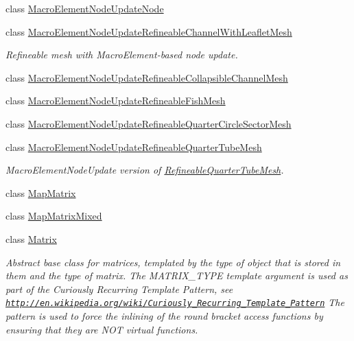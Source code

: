 \begin{DoxyCompactItemize}
class \hyperlink{classoomph_1_1MacroElementNodeUpdateNode}{Macro\+Element\+Node\+Update\+Node}
\item 
class \hyperlink{classoomph_1_1MacroElementNodeUpdateRefineableChannelWithLeafletMesh}{Macro\+Element\+Node\+Update\+Refineable\+Channel\+With\+Leaflet\+Mesh}
\begin{DoxyCompactList}\small\item\em Refineable mesh with Macro\+Element-\/based node update. \end{DoxyCompactList}\item 
class \hyperlink{classoomph_1_1MacroElementNodeUpdateRefineableCollapsibleChannelMesh}{Macro\+Element\+Node\+Update\+Refineable\+Collapsible\+Channel\+Mesh}
\item 
class \hyperlink{classoomph_1_1MacroElementNodeUpdateRefineableFishMesh}{Macro\+Element\+Node\+Update\+Refineable\+Fish\+Mesh}
\item 
class \hyperlink{classoomph_1_1MacroElementNodeUpdateRefineableQuarterCircleSectorMesh}{Macro\+Element\+Node\+Update\+Refineable\+Quarter\+Circle\+Sector\+Mesh}
\item 
class \hyperlink{classoomph_1_1MacroElementNodeUpdateRefineableQuarterTubeMesh}{Macro\+Element\+Node\+Update\+Refineable\+Quarter\+Tube\+Mesh}
\begin{DoxyCompactList}\small\item\em Macro\+Element\+Node\+Update version of \hyperlink{classoomph_1_1RefineableQuarterTubeMesh}{Refineable\+Quarter\+Tube\+Mesh}. \end{DoxyCompactList}\item 
class \hyperlink{classoomph_1_1MapMatrix}{Map\+Matrix}
\item 
class \hyperlink{classoomph_1_1MapMatrixMixed}{Map\+Matrix\+Mixed}
\item 
class \hyperlink{classoomph_1_1Matrix}{Matrix}
\begin{DoxyCompactList}\small\item\em Abstract base class for matrices, templated by the type of object that is stored in them and the type of matrix. The M\+A\+T\+R\+I\+X\+\_\+\+T\+Y\+PE template argument is used as part of the Curiously Recurring Template Pattern, see \href{http://en.wikipedia.org/wiki/Curiously_Recurring_Template_Pattern}{\tt http\+://en.\+wikipedia.\+org/wiki/\+Curiously\+\_\+\+Recurring\+\_\+\+Template\+\_\+\+Pattern} The pattern is used to force the inlining of the round bracket access functions by ensuring that they are N\+OT virtual functions. \end{DoxyCompactList}\item 

\end{DoxyCompactItemize}

